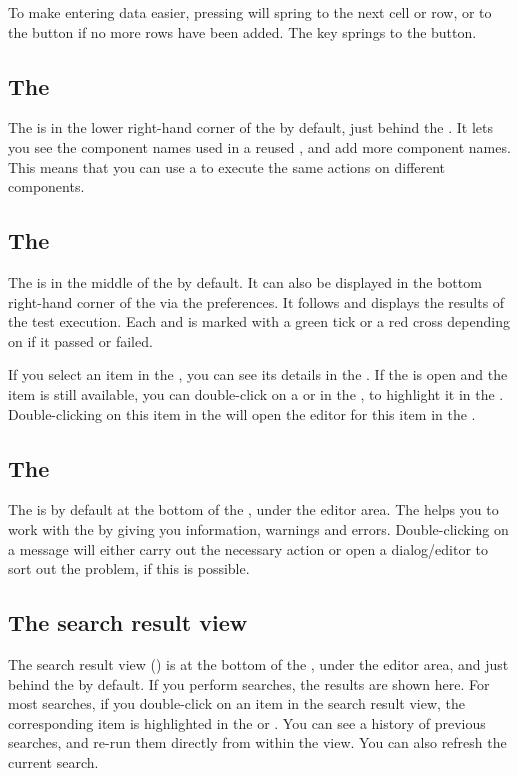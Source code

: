 To make entering data easier, pressing  will spring to the next cell or row, or to the  button if no more rows have been added. The  key  springs to the  button. 

\subsection{The \gdcompnamesview{}}
The \gdcompnamesview{} is in the lower right-hand corner of the \specpersp{}  by default, just behind the \gddatasetsview{}. It lets you see the component names used in a reused \gdcase{}, and add more component names. This means that you can use a \gdcase{} to execute the same actions on different components. 

\subsection{The \gdtestresultview{}} 

The \gdtestresultview{} is in the middle of the \execpersp{}  by default. It can also be displayed in the bottom right-hand corner of the \specpersp{} via the preferences. It follows and displays the results of the test execution. Each \gdstep{} and \gdcase{} is marked with a green tick or a red cross depending on if it passed or failed. 

If you select an item in the \gdtestresultview{}, you can see its details in the \gdpropview{}. If the \gdproject{} is open and the item is still available, you can double-click on a \gdstep{} or \gdcase{} in the \gdtestresultview{}, to highlight it in the \gdtestsuitebrowser{}. Double-clicking on this item in the \gdtestsuitebrowser{} will open the editor for this item in the \specpersp{}. 

\subsection{The \gdprobview{}}
The \gdprobview{} is by default at the bottom of the \specpersp{}, under the editor area. The \gdpropview{} helps you to work with the \ite{}  by giving you information, warnings and errors. Double-clicking on a message will either carry out the necessary action or open a dialog/editor to sort out the problem, if this is possible. 

\subsection{The search result view}
The search result view () is at the bottom of the \specpersp{}, under the editor area, and just behind the \gdprobview{} by default. If you perform searches, the results are shown here. For most searches, if you double-click on an item in the search result view, the corresponding item is highlighted in the \gdtestcasebrowser{} or \gdtestsuitebrowser{}. You can see a history of previous searches, and re-run them directly from within the view. You can also refresh the current search. 

